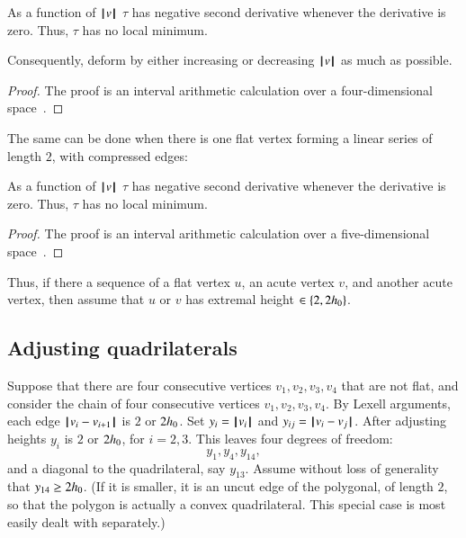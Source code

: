 \begin{lemma} As a function of ${{\hskip0.1em|\hskip-0.15em|\hskip0.1em}v{\hskip0.1em|\hskip-0.15em|\hskip0.1em}}$
 $\tau$ has negative second derivative whenever the derivative is zero.  Thus, $\tau$ has no local minimum.
\end{lemma}

Consequently,  deform by either increasing or decreasing ${{\hskip0.1em|\hskip-0.15em|\hskip0.1em}v{\hskip0.1em|\hskip-0.15em|\hskip0.1em}}$ as much as possible.  

\begin{proof}
The proof is an interval arithmetic calculation over a four-dimensional space~\cite[cc:d2a]{hales:2009:nonlinear}.  %
\end{proof}


The same can be done when there is one flat vertex forming a linear series of length $2$, with compressed edges:

\begin{lemma}
As a function of ${{\hskip0.1em|\hskip-0.15em|\hskip0.1em}v{\hskip0.1em|\hskip-0.15em|\hskip0.1em}}$
 $\tau$ has negative second derivative whenever the derivative is zero.  Thus, $\tau$ has no local minimum.
\end{lemma}

\begin{proof}
The proof is an interval arithmetic calculation over a five-dimensional space~\cite[cc:d2b]{hales:2009:nonlinear}. %
\end{proof}


Thus, if there a sequence of a flat vertex $u$, an acute vertex $v$, and another acute vertex, then  assume that $u$ or $v$ has extremal height $\in\{2,2{h_0}\}$.


\subsection{Adjusting quadrilaterals}

Suppose that there are four consecutive vertices $v_1,v_2,v_3,v_4$ that are not flat, and consider the chain of four consecutive vertices $v_1,v_2,v_3,v_4$. By Lexell arguments, each edge ${\hskip0.1em|\hskip-0.15em|\hskip0.1em}v_i - v_{i+1}{\hskip0.1em|\hskip-0.15em|\hskip0.1em}$ is $2$ or $2{h_0}$. Set $y_i = {{\hskip0.1em|\hskip-0.15em|\hskip0.1em}v_i{\hskip0.1em|\hskip-0.15em|\hskip0.1em}}$ and $y_{ij} = {\hskip0.1em|\hskip-0.15em|\hskip0.1em}v_i - v_j{\hskip0.1em|\hskip-0.15em|\hskip0.1em}$. After adjusting heights $y_i$ is $2$ or $2{h_0}$, for $i=2,3$. This leaves four degrees of freedom:
$$
y_1,y_4,y_{14},
$$
and a diagonal to the quadrilateral, say $y_{13}$. Assume without loss of generality that  $y_{14}\ge 2{h_0}$.  (If it is smaller, it is an uncut edge of the polygonal, of length $2$, so that the polygon is actually a convex quadrilateral.  This special case is most easily dealt with separately.)

